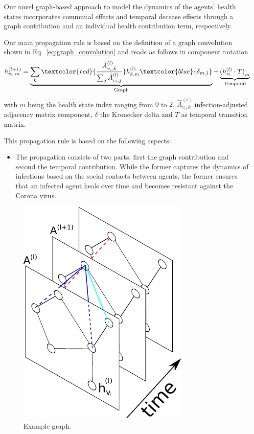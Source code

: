 Our novel graph-based approach to model the dynamics of the agents' health states incorporates communal effects and temporal decease effects through a graph contribution and an individual health contribution term, respectively.

Our main propagation rule is based on the definition of a graph convolution shown in Eq.~\eqref{eq:graph_convolution} and reads as follows in component notation
\begin{equation}
	h_{v_i, m}^{(l+1)}
	=
	\underbrace{
		\sum_k \textcolor{red}{\frac{\hat{A}_{v_i, k}^{(l)}}{\sum_j \hat{A}_{v_i, j}^{(l)}}} h_{k, m}^{(l)} \textcolor{blue}{\delta_{m, 1}}
	}_{\text{Graph}}
	+
	\underbrace{
		{(h_{v_i}^{(l)}\cdot T)}_m
	}_{\text{Temporal}}
\end{equation}
with $m$ being the health state index ranging from $0$ to $2$, $\hat{A}_{v_i, k}^{(l)}$ infection-adjusted adjacency matrix component, $\delta$ the Kronecker delta and $T$ as temporal transition matrix.

This propagation rule is based on the following aspects:

\begin{itemize}
	\item The propagation consists of two parts, first the graph contribution and second the temporal contribution. While the former captures the dynamics of infections based on the social contacts between agents, the former ensures that an infected agent heals over time and becomes resistant against the Corona virus.
\end{itemize}

\begin{figure}[H]
	\centering
	\includegraphics[width=0.4\columnwidth]{img/state_propagation.pdf}
	\caption{Example graph.}
	\label{fig:propagation}
\end{figure}


